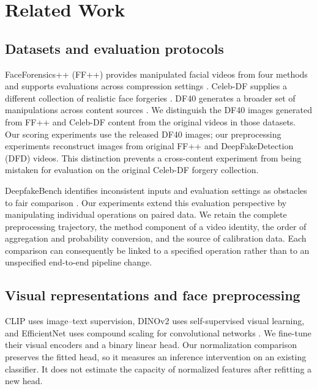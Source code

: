 \documentclass{ieeeaccess}
\begin{document}
\section{Related Work}\label{related-work}

\subsection{Datasets and evaluation
protocols}\label{datasets-and-evaluation-protocols}

FaceForensics++ (FF++) provides manipulated facial videos from four
methods and supports evaluations across compression settings
\citep{faceforensics}. Celeb-DF supplies a different collection of
realistic face forgeries \citep{celebdf}. DF40 generates a broader set
of manipulations across content sources \citep{df40}. We distinguish the
DF40 images generated from FF++ and Celeb-DF content from the original
videos in those datasets. Our scoring experiments use the released DF40
images; our preprocessing experiments reconstruct images from original
FF++ and DeepFakeDetection (DFD) videos. This distinction prevents a
cross-content experiment from being mistaken for evaluation on the
original Celeb-DF forgery collection.

DeepfakeBench identifies inconsistent inputs and evaluation settings as
obstacles to fair comparison \citep{deepfakebench}. Our experiments
extend this evaluation perspective by manipulating individual operations
on paired data. We retain the complete preprocessing trajectory, the
method component of a video identity, the order of aggregation and
probability conversion, and the source of calibration data. Each
comparison can consequently be linked to a specified operation rather
than to an unspecified end-to-end pipeline change.

\subsection{Visual representations and face
preprocessing}\label{visual-representations-and-face-preprocessing}

CLIP uses image--text supervision, DINOv2 uses self-supervised visual
learning, and EfficientNet uses compound scaling for convolutional
networks \citep{clip, dinov2, efficientnet}. We fine-tune their visual
encoders and a binary linear head. Our normalization comparison
preserves the fitted head, so it measures an inference intervention on
an existing classifier. It does not estimate the capacity of normalized
features after refitting a new head.
\end{document}
